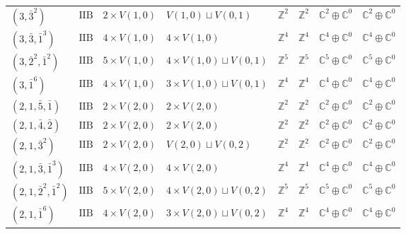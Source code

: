\documentclass[11pt,a4paper]{article}
\begin{document}
\begin{appendix}
\begin{table}
\begin{tabular}{C{2.65cm}C{0.85cm}C{3.0cm}C{3.0cm}C{2.25cm}C{2.25cm}C{1.55cm}C{1.55cm}}
\((3, \bar{3}^{2})\) & \(\mathrm{IIB}\) & \(2 \times V(1,0)\) & \(V(1,0) \sqcup V(0,1)\) & \(\mathbb{Z}^{2}\) & \(\mathbb{Z}^{2}\) & \(\mathbb{C}^{2} \oplus \mathbb{C}^{0}\) & \(\mathbb{C}^{2} \oplus \mathbb{C}^{0}\) \\
\((3, \bar{3}, \bar{1}^{3})\) & \(\mathrm{IIB}\) & \(4 \times V(1,0)\) & \(4 \times V(1,0)\) & \(\mathbb{Z}^{4}\) & \(\mathbb{Z}^{4}\) & \(\mathbb{C}^{4} \oplus \mathbb{C}^{0}\) & \(\mathbb{C}^{4} \oplus \mathbb{C}^{0}\) \\
\((3, \bar{2}^{2}, \bar{1}^{2})\) & \(\mathrm{IIB}\) & \(5 \times V(1,0)\) & \(4 \times V(1,0) \sqcup V(0,1)\) & \(\mathbb{Z}^{5}\) & \(\mathbb{Z}^{5}\) & \(\mathbb{C}^{5} \oplus \mathbb{C}^{0}\) & \(\mathbb{C}^{5} \oplus \mathbb{C}^{0}\) \\
\((3, \bar{1}^{6})\) & \(\mathrm{IIB}\) & \(4 \times V(1,0)\) & \(3 \times V(1,0) \sqcup V(0,1)\) & \(\mathbb{Z}^{4}\) & \(\mathbb{Z}^{4}\) & \(\mathbb{C}^{4} \oplus \mathbb{C}^{0}\) & \(\mathbb{C}^{4} \oplus \mathbb{C}^{0}\) \\
\((2, 1, \bar{5}, \bar{1})\) & \(\mathrm{IIB}\) & \(2 \times V(2,0)\) & \(2 \times V(2,0)\) & \(\mathbb{Z}^{2}\) & \(\mathbb{Z}^{2}\) & \(\mathbb{C}^{2} \oplus \mathbb{C}^{0}\) & \(\mathbb{C}^{2} \oplus \mathbb{C}^{0}\) \\
\((2, 1, \bar{4}, \bar{2})\) & \(\mathrm{IIB}\) & \(2 \times V(2,0)\) & \(2 \times V(2,0)\) & \(\mathbb{Z}^{2}\) & \(\mathbb{Z}^{2}\) & \(\mathbb{C}^{2} \oplus \mathbb{C}^{0}\) & \(\mathbb{C}^{2} \oplus \mathbb{C}^{0}\) \\
\((2, 1, \bar{3}^{2})\) & \(\mathrm{IIB}\) & \(2 \times V(2,0)\) & \(V(2,0) \sqcup V(0,2)\) & \(\mathbb{Z}^{2}\) & \(\mathbb{Z}^{2}\) & \(\mathbb{C}^{2} \oplus \mathbb{C}^{0}\) & \(\mathbb{C}^{2} \oplus \mathbb{C}^{0}\) \\
\((2, 1, \bar{3}, \bar{1}^{3})\) & \(\mathrm{IIB}\) & \(4 \times V(2,0)\) & \(4 \times V(2,0)\) & \(\mathbb{Z}^{4}\) & \(\mathbb{Z}^{4}\) & \(\mathbb{C}^{4} \oplus \mathbb{C}^{0}\) & \(\mathbb{C}^{4} \oplus \mathbb{C}^{0}\) \\
\((2, 1, \bar{2}^{2}, \bar{1}^{2})\) & \(\mathrm{IIB}\) & \(5 \times V(2,0)\) & \(4 \times V(2,0) \sqcup V(0,2)\) & \(\mathbb{Z}^{5}\) & \(\mathbb{Z}^{5}\) & \(\mathbb{C}^{5} \oplus \mathbb{C}^{0}\) & \(\mathbb{C}^{5} \oplus \mathbb{C}^{0}\) \\
\((2, 1, \bar{1}^{6})\) & \(\mathrm{IIB}\) & \(4 \times V(2,0)\) & \(3 \times V(2,0) \sqcup V(0,2)\) & \(\mathbb{Z}^{4}\) & \(\mathbb{Z}^{4}\) & \(\mathbb{C}^{4} \oplus \mathbb{C}^{0}\) & \(\mathbb{C}^{4} \oplus \mathbb{C}^{0}\) \\

\end{tabular}
\end{table}
\end{appendix}
\end{document}
